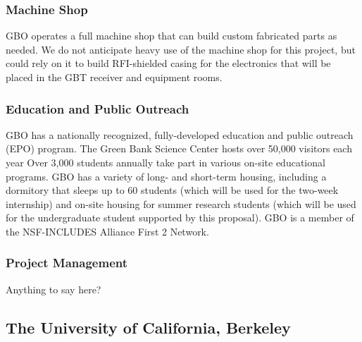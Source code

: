 \documentclass[10pt]{NSF}
\begin{document}
\subsubsection{Machine Shop}

GBO operates a full machine shop that can build custom fabricated
parts as needed.  We do not anticipate heavy use of the machine shop
for this project, but could rely on it to build RFI-shielded casing
for the electronics that will be placed in the GBT receiver and
equipment rooms.

\subsubsection{Education and Public Outreach}

GBO has a nationally recognized, fully-developed education and public
outreach (EPO) program.  The Green Bank Science Center hosts over
50,000 visitors each year Over 3,000 students annually take part in
various on-site educational programs.  GBO has a variety of long- and
short-term housing, including a dormitory that sleeps up to 60
students (which will be used for the two-week internship) and on-site
housing for summer research students (which will be used for the
undergraduate student supported by this proposal).  GBO is a member of
the NSF-INCLUDES Alliance First 2 Network.

\subsubsection{Project Management}

Anything to say here?

\subsection{The University of California, Berkeley}
\end{document}
